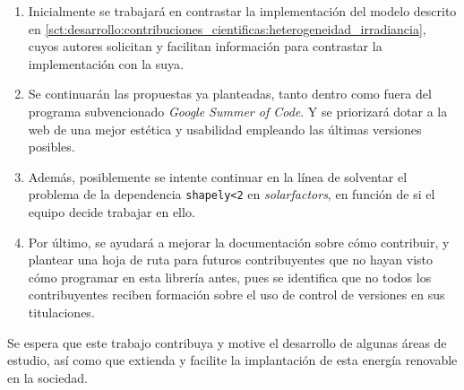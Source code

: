 \begin{enumerate}
    \item Inicialmente se trabajará en contrastar la implementación del modelo descrito en \ref{sct:desarrollo:contribuciones_cientificas:heterogeneidad_irradiancia}, cuyos autores solicitan y facilitan información para contrastar la implementación con la suya.
    \item Se continuarán las propuestas ya planteadas, tanto dentro como fuera del programa subvencionado \textit{Google Summer of Code}. Y se priorizará dotar a la web de una mejor estética y usabilidad empleando las últimas versiones posibles.
    \item Además, posiblemente se intente continuar en la línea de solventar el problema de la dependencia \texttt{shapely<2} en \textit{solarfactors}, en función de si el equipo decide trabajar en ello.
    \item Por último, se ayudará a mejorar la documentación sobre cómo contribuir, y plantear una hoja de ruta para futuros contribuyentes que no hayan visto cómo programar en esta librería antes, pues se identifica que no todos los contribuyentes reciben formación sobre el uso de control de versiones en sus titulaciones.
\end{enumerate}

Se espera que este trabajo contribuya y motive el desarrollo de algunas áreas de estudio, así como que extienda y facilite la implantación de esta energía renovable en la sociedad.
